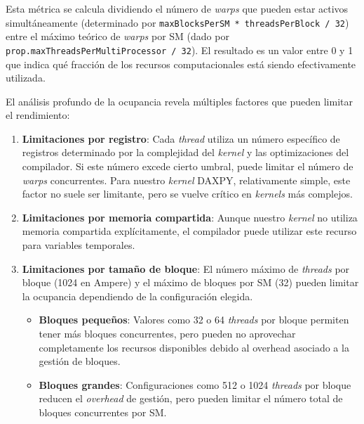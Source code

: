         Esta métrica se calcula dividiendo el número de \textit{warps} que pueden estar activos simultáneamente (determinado por \texttt{maxBlocksPerSM * threadsPerBlock / 32}) entre el máximo teórico de \textit{warps} por SM (dado por \texttt{prop.maxThreadsPerMultiProcessor / 32}). El resultado es un valor entre 0 y 1 que indica qué fracción de los recursos computacionales está siendo efectivamente utilizada.
    
        El análisis profundo de la ocupancia revela múltiples factores que pueden limitar el rendimiento:
    
        \begin{enumerate}
    
            \item \textbf{Limitaciones por registro}: Cada \textit{thread} utiliza un número específico de registros determinado por la complejidad del \textit{kernel} y las optimizaciones del compilador. Si este número excede cierto umbral, puede limitar el número de \textit{warps} concurrentes. Para nuestro \textit{kernel} DAXPY, relativamente simple, este factor no suele ser limitante, pero se vuelve crítico en \textit{kernels} más complejos.
                        
            \item \textbf{Limitaciones por memoria compartida}: Aunque nuestro \textit{kernel} no utiliza memoria compartida explícitamente, el compilador puede utilizar este recurso para variables temporales.
            
            \item \textbf{Limitaciones por tamaño de bloque}: El número máximo de \textit{threads} por bloque (1024 en Ampere) y el máximo de bloques por SM (32) pueden limitar la ocupancia dependiendo de la configuración elegida.
            
            \begin{itemize}
                
                \item \textbf{Bloques pequeños}: Valores como 32 o 64 \textit{threads} por bloque permiten tener más bloques concurrentes, pero pueden no aprovechar completamente los recursos disponibles debido al overhead asociado a la gestión de bloques.
                
                \item \textbf{Bloques grandes}: Configuraciones como 512 o 1024 \textit{threads} por bloque reducen el \textit{overhead} de gestión, pero pueden limitar el número total de bloques concurrentes por SM.
            
            \end{itemize}
            
        \end{enumerate}
    
